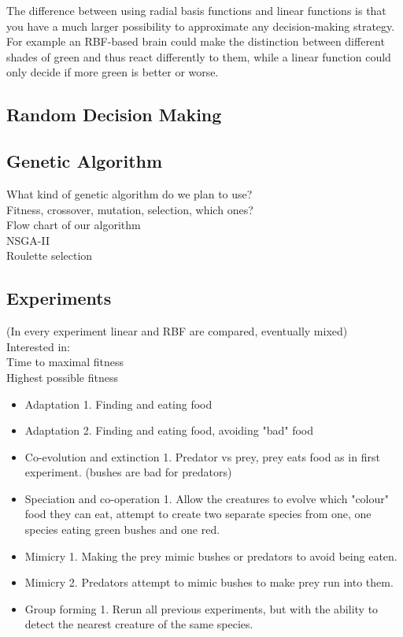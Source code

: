\documentclass[a4paper,11pt]{kth-mag}
\begin{document}
The difference between using radial basis functions and linear functions is that you have a much larger possibility to approximate any decision-making strategy. For example an RBF-based brain could make the distinction between different shades of green and thus react differently to them, while a linear function could only decide if more green is better or worse.
\subsection{Random Decision Making}
\subsection{Genetic Algorithm}
What kind of genetic algorithm do we plan to use?\\
Fitness, crossover, mutation, selection, which ones?\\
Flow chart of our algorithm\\
NSGA-II\\
Roulette selection\\

\subsection{Experiments}
(In every experiment linear and RBF are compared, eventually mixed)\\
Interested in:\\
Time to maximal fitness\\
Highest possible fitness\\
\begin{itemize}
\item Adaptation 1. Finding and eating food
\item Adaptation 2. Finding and eating food, avoiding "bad" food
\item Co-evolution and extinction 1. Predator vs prey, prey eats food as in first experiment. (bushes are bad for predators)
\item Speciation and co-operation 1. Allow the creatures to evolve which "colour" food they can eat, attempt to create two separate species from one, one species eating green bushes and one red.
\item Mimicry 1. Making the prey mimic bushes or predators to avoid being eaten.
\item Mimicry 2. Predators attempt to mimic bushes to make prey run into them.
\item Group forming 1. Rerun all previous experiments, but with the ability to detect the nearest creature of the same species.
\end{itemize}
\end{document}
